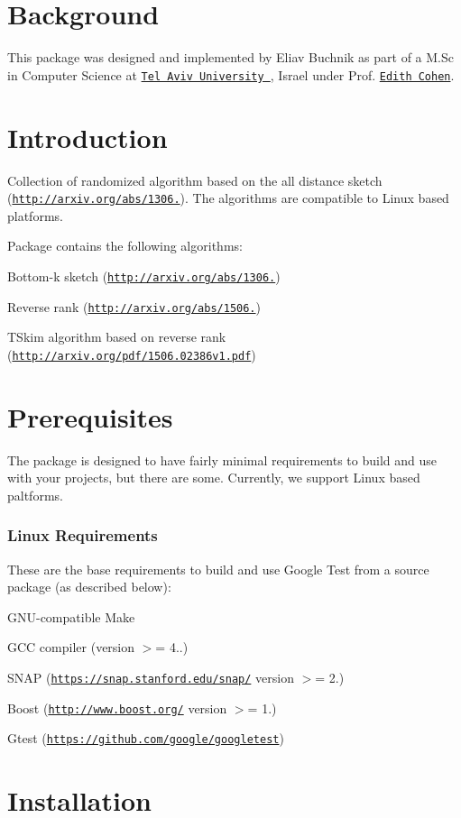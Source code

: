 \hypertarget{index_Background}{}\section{Background}\label{index_Background}
This package was designed and implemented by Eliav Buchnik as part of a M.\+Sc in Computer Science at \href{https://english.tau.ac.il/}{\tt Tel Aviv University }, Israel under Prof. \href{http://www.cohenwang.com/edith/}{\tt Edith Cohen}.\hypertarget{index_intro_sec}{}\section{Introduction}\label{index_intro_sec}
Collection of randomized algorithm based on the all distance sketch (\href{http://arxiv.org/abs/1306.3284}{\tt http\+://arxiv.\+org/abs/1306.}). The algorithms are compatible to Linux based platforms.

Package contains the following algorithms\+:
\begin{DoxyEnumerate}
\item Bottom-\/k sketch (\href{http://arxiv.org/abs/1306.3284}{\tt http\+://arxiv.\+org/abs/1306.})
\item Reverse rank (\href{http://arxiv.org/abs/1506.02386}{\tt http\+://arxiv.\+org/abs/1506.})
\item T\+Skim algorithm based on reverse rank (\href{http://arxiv.org/pdf/1506.02386v1.pdf}{\tt http\+://arxiv.\+org/pdf/1506.\+02386v1.\+pdf})
\end{DoxyEnumerate}\hypertarget{index_Prerequisites}{}\section{Prerequisites}\label{index_Prerequisites}
The package is designed to have fairly minimal requirements to build and use with your projects, but there are some. Currently, we support Linux based paltforms.

\subsubsection*{Linux Requirements}

These are the base requirements to build and use Google Test from a source package (as described below)\+:
\begin{DoxyEnumerate}
\item G\+N\+U-\/compatible Make
\item G\+C\+C compiler (version $>$= 4..)
\item S\+N\+A\+P (\href{https://snap.stanford.edu/snap/}{\tt https\+://snap.\+stanford.\+edu/snap/} version $>$= 2.)
\item Boost (\href{http://www.boost.org/}{\tt http\+://www.\+boost.\+org/} version $>$= 1.)
\item Gtest (\href{https://github.com/google/googletest}{\tt https\+://github.\+com/google/googletest})
\end{DoxyEnumerate}\hypertarget{index_install_sec}{}\section{Installation}\label{index_install_sec}
